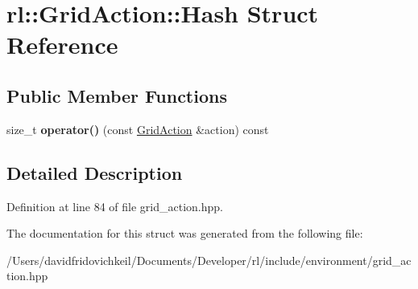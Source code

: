 \hypertarget{structrl_1_1_grid_action_1_1_hash}{}\section{rl\+:\+:Grid\+Action\+:\+:Hash Struct Reference}
\label{structrl_1_1_grid_action_1_1_hash}
\subsection*{Public Member Functions}
\begin{DoxyCompactItemize}
\item 
\hypertarget{structrl_1_1_grid_action_1_1_hash_a4ff92f6fe0cb3543b6120254adeab43d}{}\label{structrl_1_1_grid_action_1_1_hash_a4ff92f6fe0cb3543b6120254adeab43d} 
size\+\_\+t {\bfseries operator()} (const \hyperlink{structrl_1_1_grid_action}{Grid\+Action} \&action) const
\end{DoxyCompactItemize}


\subsection{Detailed Description}


Definition at line 84 of file grid\+\_\+action.\+hpp.



The documentation for this struct was generated from the following file\+:\begin{DoxyCompactItemize}
\item 
/\+Users/davidfridovichkeil/\+Documents/\+Developer/rl/include/environment/grid\+\_\+action.\+hpp\end{DoxyCompactItemize}
